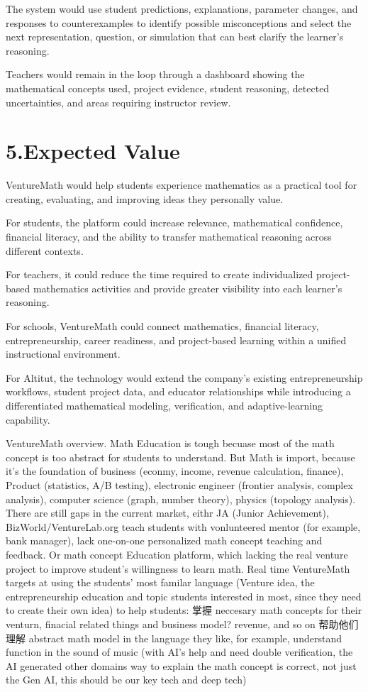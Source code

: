 The system would use student predictions, explanations, parameter changes, and responses to counterexamples to identify possible misconceptions and select the next representation, question, or simulation that can best clarify the learner’s reasoning.

Teachers would remain in the loop through a dashboard showing the mathematical concepts used, project evidence, student reasoning, detected uncertainties, and areas requiring instructor review.

\section{5.Expected Value}

VentureMath would help students experience mathematics as a practical tool for creating, evaluating, and improving ideas they personally value.

For students, the platform could increase relevance, mathematical confidence, financial literacy, and the ability to transfer mathematical reasoning across different contexts.

For teachers, it could reduce the time required to create individualized project-based mathematics activities and provide greater visibility into each learner’s reasoning.

For schools, VentureMath could connect mathematics, financial literacy, entrepreneurship, career readiness, and project-based learning within a unified instructional environment.

For Altitut, the technology would extend the company’s existing entrepreneurship workflows, student project data, and educator relationships while introducing a differentiated mathematical modeling, verification, and adaptive-learning capability.

VentureMath overview.  Math Education  is tough becuase most of the math concept is too abstract for students to understand. But Math is import, because it’s the foundation of business (econmy, income, revenue calculation, finance), Product (statistics, A/B testing), electronic engineer (frontier analysis, complex analysis), computer science (graph, number theory), physics (topology analysis). There are still gaps in the current market, eithr JA (Junior Achievement), BizWorld/VentureLab.org teach students with vonlunteered mentor (for example, bank manager), lack one-on-one personalized math concept teaching and feedback. Or math concept Education platform, which lacking the real venture project to improve student’s willingness to learn math. Real time VentureMath targets at using the students’ most familar language (Venture idea, the entrepreneurship education and topic students interested in most, since they need to create their own idea) to help students:
掌握 neccesary math concepts for their venturn, finacial related things and business model? revenue, and so on
帮助他们理解 abstract math model in the language they like, for example, understand function in the sound of music (with AI’s help and need double verification, the AI generated other domains way to explain the math concept is correct, not just the Gen AI, this should be our key tech and deep tech) 

